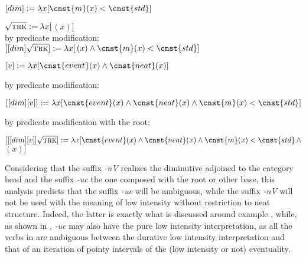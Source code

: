 \documentclass[output=paper,colorlinks,citecolor=brown]{langscibook}
\begin{document}
\newpage










\ea\label{str:ex:sem1}

\ea $[dim] :=  \lambda x [\cnst{m}(x) < \cnst{std}]$  \label{str:ex:sem1-a-new}

\ex $\sqrt{\textsc{trk}}:= \lambda x  [$$(x)]$ \label{str:ex:sem1-b-new}\\
by predicate modification:\\
$[[dim]\sqrt{\textsc{trk}}] := \lambda x [$$(x) \wedge \cnst{m}(x) < \cnst{std}]$

\ex $[v] := \lambda x [\cnst{event}(x) \wedge \cnst{neat}(x)]$ \label{str:ex:sem1-c-new}

by predicate modification:

${[[dim][v]]} := \lambda x [\cnst{event}(x) \wedge \cnst{neat}(x) \wedge \cnst{m}(x) < \cnst{std}]$ \label{str:ex:sem1-d-new}

\ex by predicate modification with the root: 

${[[[dim][v]]\sqrt{\textsc{trk}}]} := \lambda x [\cnst{event}(x) \wedge \cnst{neat}(x) \wedge \cnst{m}(x) < \cnst{std}\, \wedge$ $(x)]$ \label{str:ex:sem1-e-new}

\z
\z

\noindent Considering that the suffix \textit{-nV} realizes the diminutive adjoined to the category head and the suffix \textit{-uc} the one composed with the root or other base, this analysis predicts that the suffix \textit{-uc} will be ambiguous, while the suffix \textit{-nV} will not be used with the meaning of low intensity without restriction to neat structure. Indeed, the latter is exactly what is discussed around example , while, as shown in , \textit{-uc} may also have the pure low intensity interpretation, as all the verbs in  are ambiguous between the durative low intensity interpretation and that of an iteration of pointy intervals of the (low intensity or not) eventuality.
\end{document}
